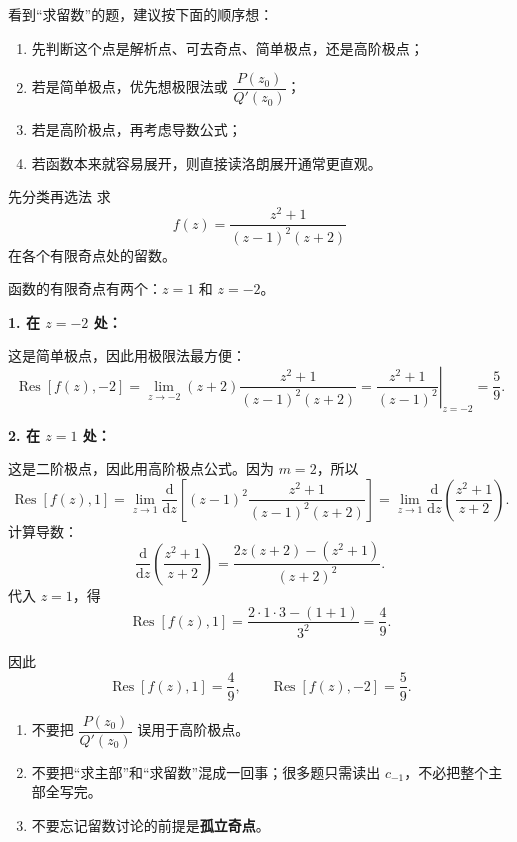 \begin{tishi}[做题时的稳妥顺序]
看到``求留数''的题，建议按下面的顺序想：
\begin{enumerate}
    \item 先判断这个点是解析点、可去奇点、简单极点，还是高阶极点；
    \item 若是简单极点，优先想极限法或 $\dfrac{P(z_0)}{Q'(z_0)}$；
    \item 若是高阶极点，再考虑导数公式；
    \item 若函数本来就容易展开，则直接读洛朗展开通常更直观。
\end{enumerate}
\end{tishi}

\begin{lizi}{先分类再选法}{}
求
\[
    f(z)=\frac{z^2+1}{(z-1)^2(z+2)}
\]
在各个有限奇点处的留数。

\begin{jie}
函数的有限奇点有两个：$z=1$ 和 $z=-2$。

\textbf{1. 在 $z=-2$ 处：}

这是简单极点，因此用极限法最方便：
\[
    \operatorname{Res}[f(z),-2]
    =
    \lim_{z\to -2}(z+2)\frac{z^2+1}{(z-1)^2(z+2)}
    =
    \left.\frac{z^2+1}{(z-1)^2}\right|_{z=-2}
    =
    \frac{5}{9}.
\]

\textbf{2. 在 $z=1$ 处：}

这是二阶极点，因此用高阶极点公式。因为 $m=2$，所以
\[
    \operatorname{Res}[f(z),1]
    =
    \lim_{z\to 1}
    \frac{\mathrm{d}}{\mathrm{d}z}
    \left[(z-1)^2\frac{z^2+1}{(z-1)^2(z+2)}\right]
    =
    \lim_{z\to 1}
    \frac{\mathrm{d}}{\mathrm{d}z}
    \left(\frac{z^2+1}{z+2}\right).
\]
计算导数：
\[
    \frac{\mathrm{d}}{\mathrm{d}z}\left(\frac{z^2+1}{z+2}\right)
    =
    \frac{2z(z+2)-(z^2+1)}{(z+2)^2}.
\]
代入 $z=1$，得
\[
    \operatorname{Res}[f(z),1]
    =
    \frac{2\cdot 1\cdot 3-(1+1)}{3^2}
    =
    \frac{4}{9}.
\]

因此
\[
    \operatorname{Res}[f(z),1]=\frac{4}{9},\qquad
    \operatorname{Res}[f(z),-2]=\frac{5}{9}.
\]
\end{jie}
\end{lizi}

\begin{jinshi}[本节最容易犯的错]
\begin{enumerate}
    \item 不要把 $\dfrac{P(z_0)}{Q'(z_0)}$ 误用于高阶极点。
    \item 不要把``求主部''和``求留数''混成一回事；很多题只需读出 $c_{-1}$，不必把整个主部全写完。
    \item 不要忘记留数讨论的前提是\textbf{孤立奇点}。
\end{enumerate}
\end{jinshi}

